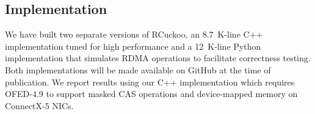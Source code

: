 \subsection{Implementation}

We have built two separate versions of RCuckoo, an 8.7~K-line C++
implementation tuned for high performance and a 12~K-line Python
implementation that simulates RDMA operations to facilitate
correctness testing. Both implementations will be made available on
GitHub at the time of publication.  We report results using our C++
implementation which requires OFED-4.9 to support masked CAS
operations and device-mapped memory on ConnectX-5 NICs.  